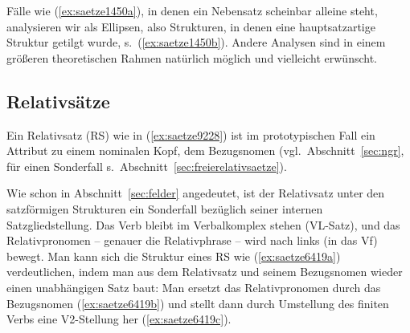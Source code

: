 Fälle wie (\ref{ex:saetze1450a}), in denen ein Nebensatz scheinbar alleine steht, analysieren wir als Ellipsen, also Strukturen, in denen eine hauptsatzartige Struktur getilgt wurde, s.\ (\ref{ex:saetze1450b}).
Andere Analysen sind in einem größeren theoretischen Rahmen natürlich möglich und vielleicht erwünscht.

\begin{exe}
  \ex\label{ex:saetze1450} 
  \begin{xlist}
  \end{xlist}
\end{exe}

\subsection{Relativsätze}

\label{sec:relativsaetze}

Ein Relativsatz (RS) wie in (\ref{ex:saetze9228}) ist im prototypischen Fall ein Attribut zu einem nominalen Kopf, dem Bezugsnomen (vgl.\ Abschnitt~\ref{sec:ngr}, für einen Sonderfall s.\ Abschnitt~\ref{sec:freierelativsaetze}).

\begin{exe}
\end{exe}

Wie schon in Abschnitt~\ref{sec:felder} angedeutet, ist der Relativsatz unter den satzförmigen Strukturen ein Sonderfall bezüglich seiner internen Satzgliedstellung.
Das Verb bleibt im Verbalkomplex stehen (VL-Satz), und das Relativpronomen -- genauer die Relativphrase -- wird nach links (in das Vf) bewegt.
Man kann sich die Struktur eines RS wie (\ref{ex:saetze6419a}) verdeutlichen, indem man aus dem Relativsatz und seinem Bezugsnomen wieder einen unabhängigen Satz baut:
Man ersetzt das Relativpronomen durch das Bezugsnomen (\ref{ex:saetze6419b}) und stellt dann durch Umstellung des finiten Verbs eine V2-Stellung her (\ref{ex:saetze6419c}).

\begin{exe}
  \ex\label{ex:saetze6419}
  \begin{xlist}
  \end{xlist}
\end{exe}

